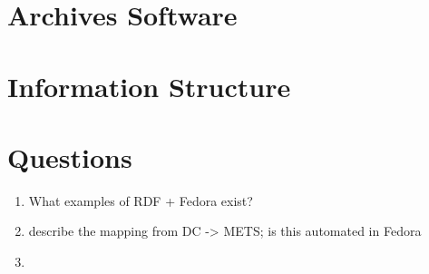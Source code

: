 \documentclass[oneside]{article}
\begin{document}
\section{Archives Software}


\section{Information Structure}


\section{Questions}
\begin{enumerate}
  \item{What examples of RDF + Fedora exist?}
  \item{describe the mapping from DC -> METS; is this automated in Fedora}
  \item{}
\end{enumerate}


\end{document}
